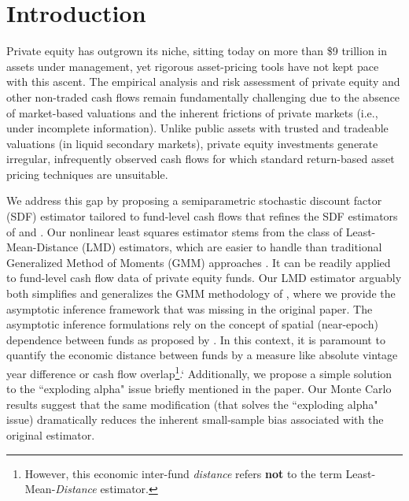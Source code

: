 \documentclass[12pt]{article}
\begin{document}
\section{Introduction}

Private equity has outgrown its niche, sitting today on more than \$9 trillion in assets under management, yet rigorous asset-pricing tools have not kept pace with this ascent.
The empirical analysis and risk assessment of private equity and other non-traded cash flows remain fundamentally challenging due to the absence of market-based valuations and the inherent frictions of private markets (i.e., under incomplete information). 
Unlike public assets with trusted and tradeable valuations (in liquid secondary markets), private equity investments generate irregular, infrequently observed cash flows for which standard return-based asset pricing techniques are unsuitable.

We address this gap by proposing a semiparametric stochastic discount factor (SDF) estimator tailored to fund-level cash flows that refines the SDF estimators of \cite{DLP12} and \cite{KN16}.
Our nonlinear least squares estimator stems from the class of Least-Mean-Distance (LMD) estimators, which are easier to handle than traditional Generalized Method of Moments (GMM) approaches \citep{PP97}.
It can be readily applied to fund-level cash flow data of private equity funds.
Our LMD estimator arguably both simplifies and generalizes the GMM methodology of \cite{DLP12}, where we provide the asymptotic inference framework that was missing in the original paper.
The asymptotic inference formulations rely on the concept of spatial (near-epoch) dependence between funds as proposed by \cite{KN16}.
In this context, it is paramount to quantify the economic distance between funds by a measure like absolute vintage year difference or cash flow overlap\footnote{However, this economic inter-fund \emph{distance} refers \textbf{not} to the term Least-Mean-\emph{Distance} estimator.}.`
Additionally, we propose a simple solution to the ``exploding alpha" issue briefly mentioned in the \cite{DLP12} paper.
Our Monte Carlo results suggest that the same modification (that solves the ``exploding alpha" issue) dramatically reduces the inherent small-sample bias associated with the original \cite{DLP12} estimator.
\end{document}
